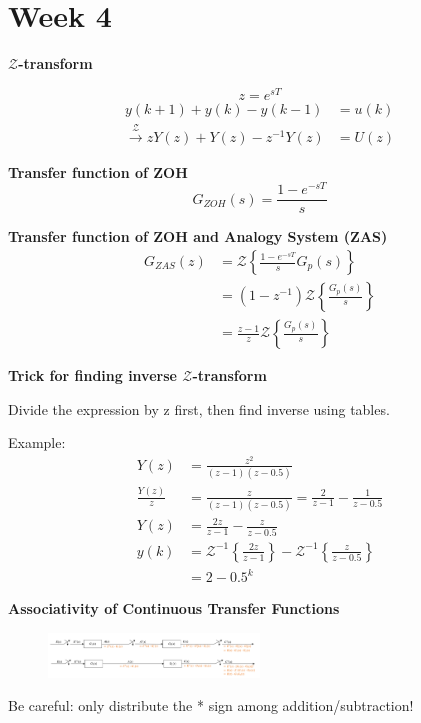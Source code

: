 \section{Week 4}
\textbf{$\mathcal{Z}$-transform}

\begin{equation*}
    z = e^{sT}
\end{equation*}
\begin{align*}
        y(k+1) + y(k) - y(k-1) &= u(k) \\
        \xrightarrow{\mathcal{Z}} zY(z) + Y(z) - z^{-1} Y(z) &= U(z)
\end{align*}

\textbf{Transfer function of ZOH}
\begin{equation*}
    G_{ZOH}(s) = \frac{1-e^{-sT}}{s} 
\end{equation*}

\textbf{Transfer function of ZOH and Analogy System (ZAS)}
\begin{align*}
    G_{ZAS}(z) &= \mathcal{Z}\left\{\frac{1-e^{-sT}}{s}G_{p}(s)\right\} \\
    &=  (1-z^{-1})\mathcal{Z}\left\{\frac{G_p (s)}{s}\right\} \\
    &= \frac{z-1}{z} \mathcal{Z}\left\{\frac{G_p (s)}{s}\right\}
\end{align*}

\textbf{Trick for finding inverse $\mathcal{Z}$-transform}

Divide the expression by z first, then find inverse using tables.

Example:
\begin{align*}
    Y(z) &= \frac{z^2}{(z-1)(z-0.5) } \\
    \frac{Y(z)}{z} &= \frac{z}{(z-1)(z-0.5)} = \frac{2}{z-1} - \frac{1}{z-0.5} \\
    Y(z) &= \frac{2z}{z-1} - \frac{z}{z-0.5} \\
    y(k) &= \mathcal{Z}^{-1}\left\{\frac{2z}{z-1}\right\} - \mathcal{Z}^{-1}\left\{ \frac{z}{z-0.5}\right\} \\
    &= 2 - 0.5^{k}
\end{align*}

\textbf{Associativity of Continuous Transfer Functions}
\begin{figure}[H]
    \centering
    \includegraphics[width=0.5\textwidth]{images/associativity.png}
\end{figure}
Be careful: only distribute the * sign among addition/subtraction!
